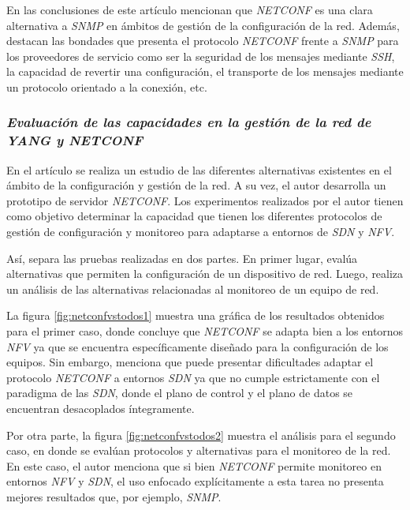En las conclusiones de este artículo mencionan que \textit{NETCONF} es una clara alternativa a \textit{SNMP} en ámbitos de gestión de la configuración de la red. Además, destacan las bondades que presenta el protocolo \textit{NETCONF} frente a \textit{SNMP} para los proveedores de servicio como ser la seguridad de los mensajes mediante \textit{SSH}, la capacidad de revertir una configuración, el transporte de los mensajes mediante un protocolo orientado a la conexión, etc.



\subsubsection*{\textit{Evaluación de las capacidades en la gestión de la red de YANG y NETCONF}}

En el artículo \parencite{netconfvstodos} se realiza un estudio de las diferentes alternativas existentes en el ámbito de la configuración y gestión de la red. A su vez, el autor desarrolla un prototipo de servidor \textit{NETCONF}. Los experimentos realizados por el autor tienen como objetivo determinar la capacidad que tienen los diferentes protocolos de gestión de configuración y monitoreo para adaptarse a entornos de \textit{SDN} y \textit{NFV}. 

Así, separa las pruebas realizadas en dos partes. En primer lugar, evalúa alternativas que permiten la configuración de un dispositivo de red. Luego, realiza un análisis de las alternativas relacionadas al monitoreo de un equipo de red.

La figura \ref{fig:netconfvstodos1} muestra una gráfica de los resultados obtenidos para el primer caso, donde concluye que \textit{NETCONF} se adapta bien a los entornos \textit{NFV} ya que se encuentra específicamente diseñado para la configuración de los equipos. Sin embargo, menciona que puede presentar dificultades adaptar el protocolo \textit{NETCONF} a entornos \textit{SDN} ya que no cumple estrictamente con el paradigma de las \textit{SDN}, donde el plano de control y el plano de datos se encuentran desacoplados íntegramente.

Por otra parte, la figura \ref{fig:netconfvstodos2} muestra el análisis para el segundo caso, en donde se evalúan protocolos y alternativas para el monitoreo de la red. En este caso, el autor menciona que si bien \textit{NETCONF} permite monitoreo en entornos \textit{NFV} y \textit{SDN}, el uso enfocado explícitamente a esta tarea no presenta mejores resultados que, por ejemplo, \textit{SNMP}.



